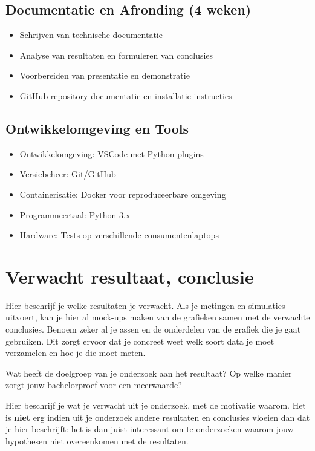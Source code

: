 \subsection{Documentatie en Afronding (4 weken)}
\begin{itemize}
    \item Schrijven van technische documentatie
    \item Analyse van resultaten en formuleren van conclusies
    \item Voorbereiden van presentatie en demonstratie
    \item GitHub repository documentatie en installatie-instructies
\end{itemize}

\subsection{Ontwikkelomgeving en Tools}
\begin{itemize}
    \item Ontwikkelomgeving: VSCode met Python plugins
    \item Versiebeheer: Git/GitHub
    \item Containerisatie: Docker voor reproduceerbare omgeving
    \item Programmeertaal: Python 3.x
    \item Hardware: Tests op verschillende consumentenlaptops
\end{itemize}

\section{Verwacht resultaat, conclusie}%
\label{sec:verwachte_resultaten}

Hier beschrijf je welke resultaten je verwacht. Als je metingen en simulaties uitvoert, kan je hier al mock-ups maken van de grafieken samen met de verwachte conclusies. Benoem zeker al je assen en de onderdelen van de grafiek die je gaat gebruiken. Dit zorgt ervoor dat je concreet weet welk soort data je moet verzamelen en hoe je die moet meten.

Wat heeft de doelgroep van je onderzoek aan het resultaat? Op welke manier zorgt jouw bachelorproef voor een meerwaarde?

Hier beschrijf je wat je verwacht uit je onderzoek, met de motivatie waarom. Het is \textbf{niet} erg indien uit je onderzoek andere resultaten en conclusies vloeien dan dat je hier beschrijft: het is dan juist interessant om te onderzoeken waarom jouw hypothesen niet overeenkomen met de resultaten.

